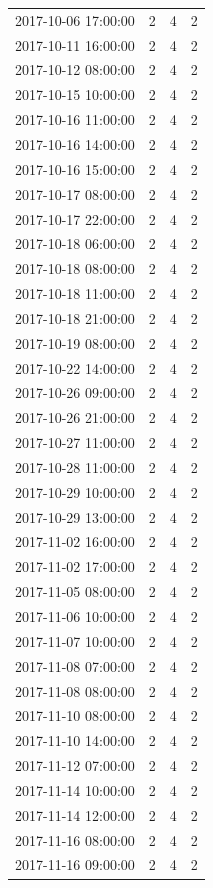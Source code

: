 \begin{tabular}{lrrr}
2017-10-06 17:00:00 & 2 & 4 & 2 \\
2017-10-11 16:00:00 & 2 & 4 & 2 \\
2017-10-12 08:00:00 & 2 & 4 & 2 \\
2017-10-15 10:00:00 & 2 & 4 & 2 \\
2017-10-16 11:00:00 & 2 & 4 & 2 \\
2017-10-16 14:00:00 & 2 & 4 & 2 \\
2017-10-16 15:00:00 & 2 & 4 & 2 \\
2017-10-17 08:00:00 & 2 & 4 & 2 \\
2017-10-17 22:00:00 & 2 & 4 & 2 \\
2017-10-18 06:00:00 & 2 & 4 & 2 \\
2017-10-18 08:00:00 & 2 & 4 & 2 \\
2017-10-18 11:00:00 & 2 & 4 & 2 \\
2017-10-18 21:00:00 & 2 & 4 & 2 \\
2017-10-19 08:00:00 & 2 & 4 & 2 \\
2017-10-22 14:00:00 & 2 & 4 & 2 \\
2017-10-26 09:00:00 & 2 & 4 & 2 \\
2017-10-26 21:00:00 & 2 & 4 & 2 \\
2017-10-27 11:00:00 & 2 & 4 & 2 \\
2017-10-28 11:00:00 & 2 & 4 & 2 \\
2017-10-29 10:00:00 & 2 & 4 & 2 \\
2017-10-29 13:00:00 & 2 & 4 & 2 \\
2017-11-02 16:00:00 & 2 & 4 & 2 \\
2017-11-02 17:00:00 & 2 & 4 & 2 \\
2017-11-05 08:00:00 & 2 & 4 & 2 \\
2017-11-06 10:00:00 & 2 & 4 & 2 \\
2017-11-07 10:00:00 & 2 & 4 & 2 \\
2017-11-08 07:00:00 & 2 & 4 & 2 \\
2017-11-08 08:00:00 & 2 & 4 & 2 \\
2017-11-10 08:00:00 & 2 & 4 & 2 \\
2017-11-10 14:00:00 & 2 & 4 & 2 \\
2017-11-12 07:00:00 & 2 & 4 & 2 \\
2017-11-14 10:00:00 & 2 & 4 & 2 \\
2017-11-14 12:00:00 & 2 & 4 & 2 \\
2017-11-16 08:00:00 & 2 & 4 & 2 \\
2017-11-16 09:00:00 & 2 & 4 & 2 \\

\end{tabular}
